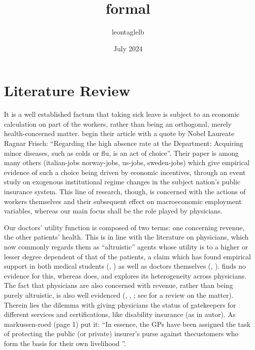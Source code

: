 \documentclass{article}
\title{formal}
\author{leontaglelb }
\date{July 2024}
\begin{document}
\maketitle

\section{Literature Review}


It is a well established factum that taking sick leave is subject to an economic calculation on part of the workers, rather than being an orthogonal, merely health-concerned matter. \cite{JohanssonPalme} begin their article with a quote by Nobel Laureate Ragnar Frisch: ``Regarding the high absence rate at the Department: Acquiring minor diseases, such as colds or flu, is an act of choice''. Their paper is among many others (italian-jobs
norway-jobs, us-jobs, sweden-jobs) which give empirical evidence of such a choice being driven by economic incentives, through an event study on exogenous institutional regime changes in the subject nation's public insurance system. This line of research, though, is concerned with the actions of workers themselves and their subsequent effect on macroeconomic employment variables, whereas our main focus shall be the role played by physicians.

Our doctors' utility function is composed of two terms: one concerning revenue, the other patients' health. This is in line with the literature on physicians, which now commonly regards them as ``altruistic'' agents whose utility is to a higher or lesser degree dependent of that of the patients, a claim which has found empirical support in both medical students (\cite{avengers}, ) as well as doctors themselves (\cite{hippocrates}, \cite{brosigkoch}). \cite{crea2019physician} finds no evidence for this, whereas \cite{godager2013profit} does, and explores its heterogeneity across physicians. The fact that physicians are also concerned with revenue, rather than being purely altruistic, is also well evidenced (\cite{clemensgottlieb}, \cite{HSW}, \cite{autor}; see \cite{rrk2012} for a review on the matter). Therein lies the dilemma with giving physicians the status of gatekeepers for different services and certifications, like disability insurance (as in autor). As markussen-roed (page 1) put it: ``In essence, the GPs have been assigned the task of protecting the public (or private) insurer's purse against thecustomers who form the basis for their own livelihood ''.
\end{document}
